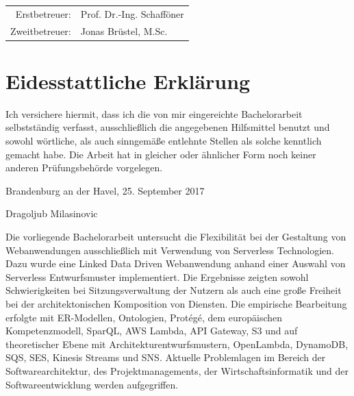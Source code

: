 \documentclass[
12pt,
english,
ngerman,
headsepline,
twoside,
openright,
numbers=noenddot,version=first
]{scrreprt}
\makeatletter
\providecommand{\tabularnewline}{\\}
\renewenvironment{abstract}{
\@beginparpenalty\@lowpenalty
\begin{center}
\normalfont\sectfont\nobreak\abstractname
\end{center}
\@endparpenalty\@M
}{
\par
}
\let\myTOC\tableofcontents
\renewcommand\tableofcontents{
\begin{spacing}{1.1}
\myTOC
\end{spacing}
\clearpage
\pagenumbering{arabic}
}
\makeatother
\begin{document}
\vspace{1cm}

\noindent \begin{center}
\medskip{}
\begin{tabular}{rl}
Erstbetreuer: & Prof. Dr.-Ing. Schafföner\tabularnewline
Zweitbetreuer: & Jonas Brüstel, M.Sc.\tabularnewline
\end{tabular}
\par\end{center}

\noindent \begin{center}
{\huge }
\par\end{center}{\huge \par}

\newpage{}

%
\tableofcontents{}

\pagestyle{scrheadings}

\chapter*{Eidesstattliche Erklärung}

Ich versichere hiermit, dass ich die von mir eingereichte Bachelorarbeit selbstständig verfasst, ausschließlich die angegebenen Hilfsmittel benutzt und sowohl wörtliche, als auch sinngemäße entlehnte Stellen als solche kenntlich gemacht habe. Die Arbeit hat in gleicher oder ähnlicher Form noch keiner anderen Prüfungsbehörde vorgelegen.

Brandenburg an der Havel, 25. September 2017

\vspace{3cm}

Dragoljub Milasinovic
\clearpage
\begin{abstract}

Die vorliegende Bachelorarbeit untersucht die Flexibilität bei der Gestaltung von Webanwendungen ausschließlich mit Verwendung von Serverless Technologien. Dazu wurde eine Linked Data Driven Webanwendung anhand einer Auswahl von Serverless Entwurfsmuster implementiert. Die Ergebnisse zeigten sowohl Schwierigkeiten bei Sitzungsverwaltung der Nutzern als auch eine große Freiheit bei der architektonischen Komposition von Diensten. Die empirische Bearbeitung erfolgte mit ER-Modellen, Ontologien, Protégé, dem europäischen Kompetenzmodell, SparQL, AWS Lambda, API Gateway, S3 und auf theoretischer Ebene mit Architekturentwurfsmustern, OpenLambda, DynamoDB, SQS, SES, Kinesis Streams und SNS. Aktuelle Problemlagen im Bereich der Softwarearchitektur, des Projektmanagements, der Wirtschaftsinformatik und der Softwareentwicklung werden aufgegriffen. 

\end{abstract}
\end{document}
